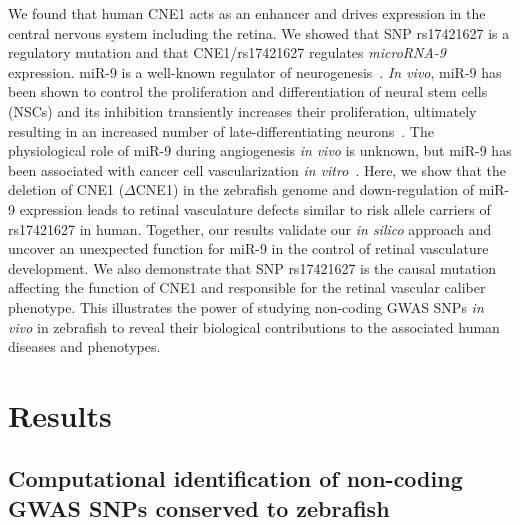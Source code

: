 We found that human CNE1 acts as an enhancer and drives expression in
the central nervous system including the retina. We showed that SNP
rs17421627 is a regulatory mutation and that CNE1/rs17421627 regulates
\emph{microRNA-9} expression. miR-9 is a well-known regulator of
neurogenesis~\citep{Coolen:2013dw}.
\emph{In vivo}, miR-9 has been shown to control the proliferation and
differentiation of neural stem cells (NSCs) and its inhibition
transiently increases their proliferation, ultimately resulting in an
increased number of late-differentiating neurons~\citep{Bonev:2011fg, Shibata:2011jm, Coolen:2012gj}. The physiological
role of miR-9 during angiogenesis \emph{in} \emph{vivo} is unknown, but
miR-9 has been associated with cancer cell vascularization \emph{in
vitro}~\citep{Zhang:2012ih, Zhuang:2012jw}. Here, we show that
the deletion of CNE1 ($\Delta$CNE1) in the zebrafish genome and down-regulation
of miR-9 expression leads to retinal vasculature defects similar to risk
allele carriers of rs17421627 in human. Together, our results validate
our \emph{in silico} approach and uncover an unexpected function for
miR-9 in the control of retinal vasculature development. We also
demonstrate that SNP rs17421627 is the causal mutation affecting the
function of CNE1 and responsible for the retinal vascular caliber
phenotype. This illustrates the power of studying non-coding GWAS SNPs
\emph{in vivo} in zebrafish to reveal their biological contributions to
the associated human diseases and phenotypes.

\section{Results}

\subsection{Computational identification of non-coding GWAS SNPs conserved to zebrafish}

